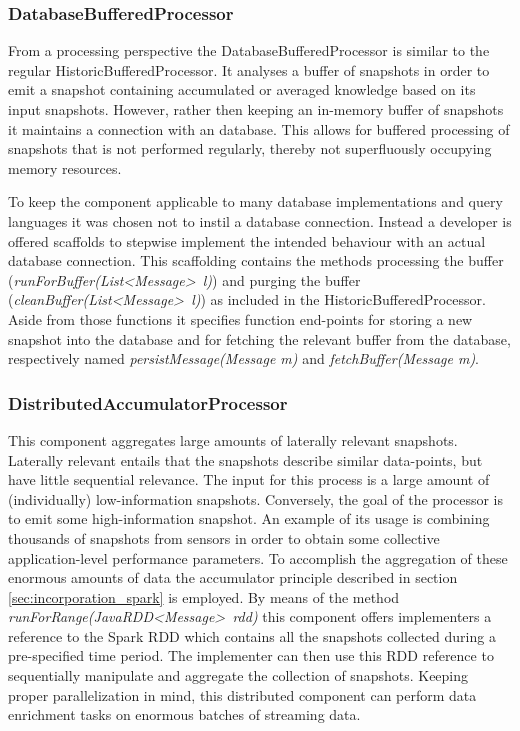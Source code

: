 \subsubsection{DatabaseBufferedProcessor}
From a processing perspective the DatabaseBufferedProcessor is similar to the regular HistoricBufferedProcessor. It analyses a buffer of snapshots in order to emit a snapshot containing accumulated or averaged knowledge based on its input snapshots. However, rather then keeping an in-memory buffer of snapshots it maintains a connection with an database. This allows for buffered processing of snapshots that is not performed regularly, thereby not superfluously occupying memory resources.

To keep the component applicable to many database implementations and query languages it was chosen not to instil a database connection. Instead a developer is offered scaffolds to stepwise implement the intended behaviour with an actual  database connection. This scaffolding contains the methods processing the buffer (\emph{runForBuffer(List\textless Message\textgreater\ l)}) and purging the buffer (\emph{cleanBuffer(List\textless Message\textgreater\ l)}) as included in the HistoricBufferedProcessor. Aside from those functions it specifies function end-points for storing a new snapshot into the database and for fetching the relevant buffer from the database, respectively named \emph{persistMessage(Message m)} and \emph{fetchBuffer(Message m)}.	

\subsubsection{DistributedAccumulatorProcessor}
This component aggregates large amounts of laterally relevant snapshots. Laterally relevant entails that the snapshots describe similar data-points, but have little sequential relevance. The input for this process is a large amount of (individually) low-information snapshots. Conversely, the goal of the processor is to emit some high-information snapshot. An example of its usage is combining thousands of snapshots from sensors in order to obtain some collective application-level performance parameters. To accomplish the aggregation of these enormous amounts of data the accumulator principle described in section \ref{sec:incorporation_spark} is employed. By means of the method \emph{runForRange(JavaRDD\textless Message\textgreater\ rdd)} this component offers implementers a reference to the Spark RDD which contains all the snapshots collected during a pre-specified time period. The implementer can then use this RDD reference to sequentially manipulate and aggregate the collection of snapshots. Keeping proper parallelization in mind, this distributed component can perform data enrichment tasks on enormous batches of streaming data.

